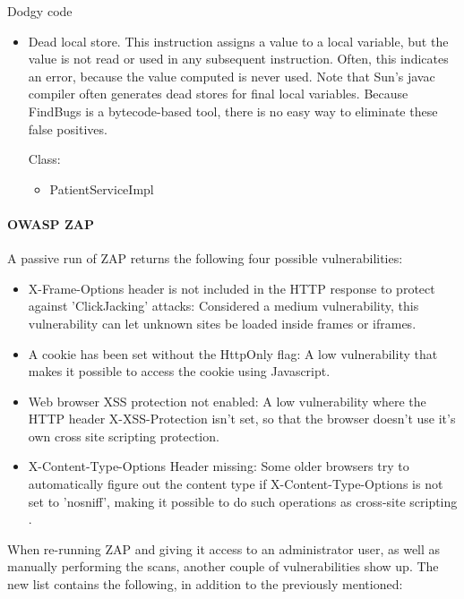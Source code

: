 \documentclass{report} %
\begin{document}
Dodgy code
  \begin{itemize}
    \item Dead local store. This instruction assigns a value to a local variable, but the
      value is not read or used in any subsequent instruction. Often, this
      indicates an error, because the value computed is never used.
      Note that Sun's javac compiler often generates dead stores for final
      local variables. Because FindBugs is a bytecode-based tool, there is
      no easy way to eliminate these false positives.

      Class:
      \begin{itemize}

        \item PatientServiceImpl
      \end{itemize}
  \end{itemize}
\paragraph{OWASP ZAP}

A passive run of ZAP returns the following four possible vulnerabilities:

\begin{itemize}
 \item X-Frame-Options header is not included in the HTTP response to protect against
  'ClickJacking' attacks: Considered a medium vulnerability, this
  vulnerability can let unknown sites be loaded inside frames or iframes.
 \item A cookie has been set without the HttpOnly flag: A low vulnerability that
   makes it possible to access the cookie using Javascript. 
 \item Web browser XSS protection not enabled: A low vulnerability where the
   HTTP header X-XSS-Protection isn't set, so that the browser doesn't use it's
   own cross site scripting protection.
 \item X-Content-Type-Options Header missing: Some older browsers try to
   automatically figure out the content type if X-Content-Type-Options is not
   set to 'nosniff', making it possible to do such operations as cross-site
   scripting \autocite[]{XFrame}.
\end{itemize}

When re-running ZAP and giving it access to an administrator user, as well as
manually performing the scans, another couple of vulnerabilities show up. The
new list contains the following, in addition to the previously mentioned:
\end{document}
